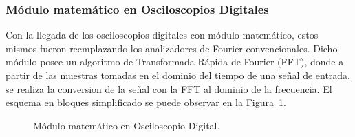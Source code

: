 \subsubsection{Módulo matemático en Osciloscopios Digitales}

    Con la llegada de los osciloscopios digitales con módulo matemático, estos mismos 
    fueron reemplazando los analizadores de Fourier convencionales.
    Dicho módulo posee un algoritmo de Transformada Rápida de Fourier (FFT), donde 
    a partir de las muestras tomadas en el dominio del tiempo de una señal de entrada,
    se realiza la conversion de la señal con la FFT al dominio de la frecuencia.
    El esquema en bloques simplificado se puede observar en la Figura~\ref{fig:MathModuleEnOscil}.
        \begin{figure}[H]
            \centering
            \caption{Módulo matemático en Osciloscopio Digital.}
            \label{fig:MathModuleEnOscil}
        \end{figure}
    
